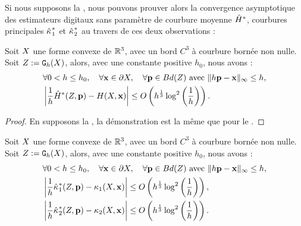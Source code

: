 Si nous supposons la , nous pouvons prouver
alors la convergence asymptotique des estimateurs digitaux sans paramètre de
courbure moyenne $\hat{H}^{*}$, courbures principales $\hat{\kappa_{}}_{1}^{*}$ et
$\hat{\kappa_{}}_{2}^{*}$ au travers de ces deux observations :
%
\begin{observation}{}
  \label{obs:curvature-estimator-3d-mean-pf-conv}
  Soit $X$ une forme convexe de $\mathbb{R}^3$, avec un bord $C^3$ à
  courbure bornée non nulle. Soit $Z := \mathtt{G}_{h}(X)$, alors, avec une
  constante positive $h_0$, nous avons :
  \begin{align}
    &\forall 0 < h \le h_0, \quad \forall \mathbf{x} \in \partial X, \quad \forall \mathbf{p} \in Bd({Z}) \text{~avec~} \| h\mathbf{p} -\mathbf{x}\|_\infty \le h, \nonumber\\
    &\left | \frac{1}{h}\hat{H}^{*}(Z,\mathbf{p}) - H(X,\mathbf{x}) \right| \le O\left( h^{\frac{1}{3}} \log^2 \left(\frac{1}{h}\right)\right) .
  \end{align}
\end{observation}
\begin{proof}
  En supposons la , la démonstration est la
  même que pour le .
\end{proof}
%
\begin{observation}{}
  \label{obs:curvature-estimator-3d-k1k2-pf-conv}
  Soit $X$ une forme convexe de $\mathbb{R}^3$, avec un bord $C^3$ à
  courbure bornée non nulle. Soit $Z := \mathtt{G}_{h}(X)$, alors, avec une
  constante positive $h_0$, nous avons :
  \begin{align}
    &\forall 0 < h \le h_0, \quad \forall \mathbf{x} \in \partial X, \quad \forall \mathbf{p} \in Bd({Z}) \text{~avec~} \| h\mathbf{p} -\mathbf{x}\|_\infty \le h, \nonumber\\
    &\left | \frac{1}{h}\hat{\kappa_{}}_{1}^{*}(Z,\mathbf{p}) - \kappa_{1}(X,\mathbf{x}) \right| \le O\left( h^{\frac{1}{3}} \log^2 \left(\frac{1}{h}\right)\right) ,\\
    &\left | \frac{1}{h}\hat{\kappa_{}}_{2}^{*}(Z,\mathbf{p}) - \kappa_{2}(X,\mathbf{x}) \right| \le O\left( h^{\frac{1}{3}} \log^2 \left(\frac{1}{h}\right)\right) .
  \end{align}
\end{observation}

